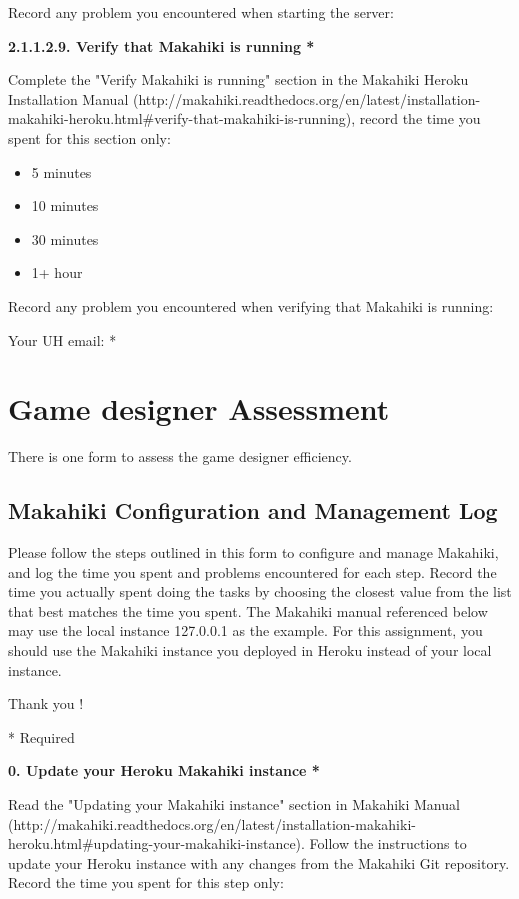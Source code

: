 Record any problem you encountered when starting the server:

{\bf 2.1.1.2.9. Verify that Makahiki is running *}

Complete the "Verify Makahiki is running" section in the Makahiki Heroku Installation Manual (http://makahiki.readthedocs.org/en/latest/installation-makahiki-heroku.html\#verify-that-makahiki-is-running), record the time you spent for this section only:

\begin{itemize}
\item 5 minutes
\item  10 minutes
\item  30 minutes
\item  1+ hour
\end{itemize}

Record any problem you encountered when verifying that Makahiki is running:

Your UH email: *

\section{Game designer Assessment}
There is one form to assess the game designer efficiency.

\subsection{Makahiki Configuration and Management Log}

Please follow the steps outlined in this form to configure and manage Makahiki, and log the time you spent and problems encountered for each step. Record the time you actually spent doing the tasks by choosing the closest value from the list that best matches the time you spent.
The Makahiki manual referenced below may use the local instance 127.0.0.1 as the example. For this assignment, you should use the Makahiki instance you deployed in Heroku instead of your local instance.

Thank you !

* Required

{\bf 0. Update your Heroku Makahiki instance *}

Read the "Updating your Makahiki instance" section in Makahiki Manual (http://makahiki.readthedocs.org/en/latest/installation-makahiki-heroku.html\#updating-your-makahiki-instance). Follow the instructions to update your Heroku instance with any changes from the Makahiki Git repository. Record the time you spent for this step only:


